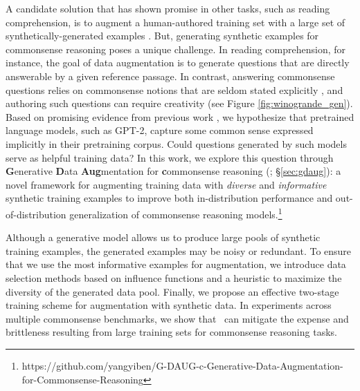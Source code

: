 \documentclass[11pt,a4paper]{article}
\newcommand{\reasoning}{commonsense reasoning\xspace}
\newcommand{\gdaug}{}
\newcommand{\gpt}{\textsc{GPT-2}\xspace}
\begin{document}
A candidate solution that has shown promise in other tasks, such as reading comprehension, is to augment a human-authored training set with a large set of synthetically-generated examples  \cite{zhou2017neural,du2017learning,zhao-etal-2018-paragraph}.  But, generating synthetic examples for commonsense reasoning poses a unique challenge.
In reading comprehension, for instance, the goal of data augmentation is to generate questions that are directly answerable by a given reference passage.
In contrast, answering commonsense questions relies on commonsense notions that are seldom stated explicitly \cite{gordon2013reporting,forbes-choi-2017-verb}, and authoring such questions can require creativity (see Figure \ref{fig:winogrande_gen}). 
Based on promising evidence from previous work \cite{Yang2018ExtractingCP,Trinh2018ASM,Bosselut2019COMETCT, davison-etal-2019-commonsense}, we hypothesize that pretrained language models, such as \gpt \cite{radford2019language}, capture some common sense expressed implicitly in their pretraining corpus.
Could questions generated by such models serve as helpful training data?
In this work, we explore this question through \textbf{G}enerative \textbf{D}ata \textbf{Aug}mentation for {\bf c}ommonsense reasoning (\textbf{\gdaug};  \S\ref{sec:gdaug}): a novel framework for augmenting training data with \textit{diverse} and \textit{informative} synthetic training examples to improve both in-distribution performance and out-of-distribution generalization of commonsense reasoning models.\footnote{https://github.com/yangyiben/G-DAUG-c-Generative-Data-Augmentation-for-Commonsense-Reasoning}

Although a generative model allows us to produce large pools of synthetic training examples, the generated examples may be noisy or redundant.
To ensure that we use the most informative examples for augmentation, we introduce data selection methods based on influence functions \cite{Koh2017UnderstandingBP} and a heuristic to maximize the diversity of the generated data pool. 
Finally, we propose an effective two-stage training scheme for augmentation with synthetic data.
In experiments across multiple commonsense benchmarks, we show that \gdaug\ can mitigate the expense and brittleness resulting from large training sets for \reasoning tasks. 
\end{document}
